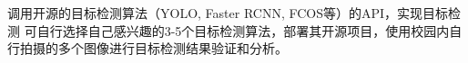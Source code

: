 调用开源的目标检测算法（YOLO, Faster RCNN, FCOS等）的API，实现目标检测
可自行选择自己感兴趣的3-5个目标检测算法，部署其开源项目，使用校园内自行拍摄的多个图像进行目标检测结果验证和分析。
